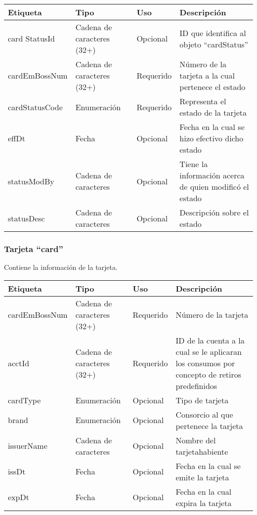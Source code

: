 \begin{center}
\begin{longtable}{|>{\centering\arraybackslash}p{}|>{\centering\arraybackslash}p{}|>{\centering\arraybackslash}p{}|>{\centering\arraybackslash}p{}|}
\hline 
\bfseries {Etiqueta} & \bfseries {Tipo} & \bfseries {Uso} & \bfseries {Descripción} \\ 
\hline 
card	StatusId & Cadena de caracteres (32+) & Opcional & ID que identifica al objeto ``cardStatus'' \\ 
\hline
cardEmBossNum & Cadena de caracteres (32+) & Requerido & Número de la tarjeta a la cual pertenece el estado \\ 
\hline 
cardStatusCode & Enumeración & Requerido & Representa el estado de la tarjeta \\
\hline 
effDt & Fecha & Opcional & Fecha en la cual se hizo efectivo dicho estado \\
\hline 
statusModBy & Cadena de caracteres & Opcional & Tiene la información acerca de quien modificó el estado \\
\hline 
statusDesc & Cadena de caracteres & Opcional & Descripción sobre el estado \\
\hline 
\end{longtable}
\end{center}

\subsubsection{Tarjeta ``card''}
Contiene la información de la tarjeta.

\begin{center}
\begin{longtable}{|>{\centering\arraybackslash}p{}|>{\centering\arraybackslash}p{}|>{\centering\arraybackslash}p{}|>{\centering\arraybackslash}p{}|}
\hline 
\bfseries {Etiqueta} & \bfseries {Tipo} & \bfseries {Uso} & \bfseries {Descripción} \\ 
\hline 
cardEmBossNum & Cadena de caracteres (32+) & Requerido & Número de la tarjeta \\ 
\hline
acctId & Cadena de caracteres (32+) & Requerido & ID de la cuenta a la cual se le aplicaran los consumos por concepto de retiros predefinidos \\ 
\hline
cardType & Enumeración & Opcional & Tipo de tarjeta \\
\hline 
brand & Enumeración & Opcional & Consorcio al que pertenece la tarjeta \\
\hline 
issuerName & Cadena de caracteres & Opcional & Nombre del tarjetahabiente \\
\hline 
issDt & Fecha & Opcional & Fecha en la cual se emite la tarjeta \\
\hline 
expDt & Fecha & Opcional & Fecha en la cual expira la tarjeta \\
\hline 
\end{longtable}
\end{center}

